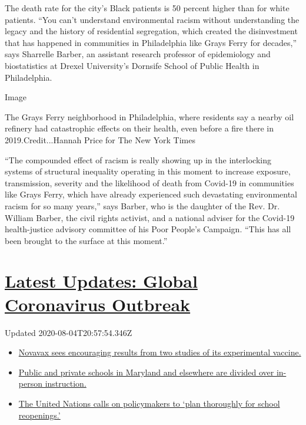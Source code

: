 The death rate for the city's Black patients is 50 percent higher than
for white patients. ``You can't understand environmental racism without
understanding the legacy and the history of residential segregation,
which created the disinvestment that has happened in communities in
Philadelphia like Grays Ferry for decades,'' says Sharrelle Barber, an
assistant research professor of epidemiology and biostatistics at Drexel
University's Dornsife School of Public Health in Philadelphia.

Image

The Grays Ferry neighborhood in Philadelphia, where residents say a
nearby oil refinery had catastrophic effects on their health, even
before a fire there in 2019.Credit...Hannah Price for The New York Times

``The compounded effect of racism is really showing up in the
interlocking systems of structural inequality operating in this moment
to increase exposure, transmission, severity and the likelihood of death
from Covid-19 in communities like Grays Ferry, which have already
experienced such devastating environmental racism for so many years,''
says Barber, who is the daughter of the Rev. Dr. William Barber, the
civil rights activist, and a national adviser for the Covid-19
health-justice advisory committee of his Poor People's Campaign. ``This
has all been brought to the surface at this moment.''

\hypertarget{latest-updates-global-coronavirus-outbreak}{%
\section{\texorpdfstring{\href{https://www.nytimes3xbfgragh.onion/2020/08/04/world/coronavirus-cases.html?action=click\&pgtype=Article\&state=default\&region=MAIN_CONTENT_1\&context=storylines_live_updates}{Latest
Updates: Global Coronavirus
Outbreak}}{Latest Updates: Global Coronavirus Outbreak}}\label{latest-updates-global-coronavirus-outbreak}}

Updated 2020-08-04T20:57:54.346Z

\begin{itemize}
\tightlist
\item
  \href{https://www.nytimes3xbfgragh.onion/2020/08/04/world/coronavirus-cases.html?action=click\&pgtype=Article\&state=default\&region=MAIN_CONTENT_1\&context=storylines_live_updates\#link-1228a480}{Novavax
  sees encouraging results from two studies of its experimental
  vaccine.}
\item
  \href{https://www.nytimes3xbfgragh.onion/2020/08/04/world/coronavirus-cases.html?action=click\&pgtype=Article\&state=default\&region=MAIN_CONTENT_1\&context=storylines_live_updates\#link-4825b93}{Public
  and private schools in Maryland and elsewhere are divided over
  in-person instruction.}
\item
  \href{https://www.nytimes3xbfgragh.onion/2020/08/04/world/coronavirus-cases.html?action=click\&pgtype=Article\&state=default\&region=MAIN_CONTENT_1\&context=storylines_live_updates\#link-50f7386d}{The
  United Nations calls on policymakers to `plan thoroughly for school
  reopenings.'}
\end{itemize}


